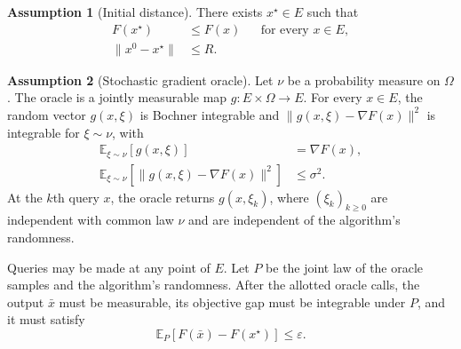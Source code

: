 \documentclass[10pt]{article}
\theoremstyle{definition}
\newtheorem{assumption}{Assumption}
\begin{document}
\begin{assumption}[Initial distance]
There exists $x^\star\in E$ such that
\[
\begin{aligned}
F(x^\star)&\leq F(x) &&\text{for every }x\in E,\\
\|x^0-x^\star\|&\leq R.
\end{aligned}
\]
\end{assumption}

\begin{assumption}[Stochastic gradient oracle]
Let $\nu$ be a probability measure on $\Omega$. The oracle is a jointly measurable map $g:E\times\Omega\to E$. For every $x\in E$, the random vector $g(x,\xi)$ is Bochner integrable and $\|g(x,\xi)-\nabla F(x)\|^2$ is integrable for $\xi\sim\nu$, with
\[
\begin{aligned}
\mathbb{E}_{\xi\sim\nu}[g(x,\xi)]&=\nabla F(x),\\
\mathbb{E}_{\xi\sim\nu}[\|g(x,\xi)-\nabla F(x)\|^2]&\leq\sigma^2.
\end{aligned}
\]
At the $k$th query $x$, the oracle returns $g(x,\xi_k)$, where $(\xi_k)_{k\geq0}$ are independent with common law $\nu$ and are independent of the algorithm's randomness.
\end{assumption}

Queries may be made at any point of $E$. Let $P$ be the joint law of the oracle samples and the algorithm's randomness. After the allotted oracle calls, the output $\bar{x}$ must be measurable, its objective gap must be integrable under $P$, and it must satisfy
\[
\mathbb{E}_{P}[F(\bar{x})-F(x^\star)]\leq\varepsilon.
\]
\end{document}
